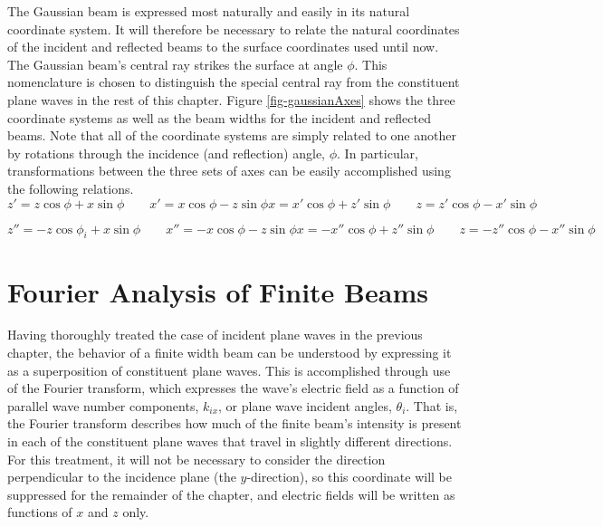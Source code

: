 \documentclass[12pt]{uthesis-v12}
\begin{document}
The Gaussian beam is expressed most naturally and easily in its natural coordinate system. It will therefore be necessary to relate the natural coordinates of the incident and reflected beams to the surface coordinates used until now. The Gaussian beam's central ray strikes the surface at angle $\phi$. This nomenclature is chosen to distinguish the special central ray from the constituent plane waves in the rest of this chapter. Figure \ref{fig-gaussianAxes} shows the three coordinate systems as well as the beam widths for the incident and reflected beams. Note that all of the coordinate systems are simply related to one another by rotations through the incidence (and reflection) angle, $\phi$. In particular, transformations between the three sets of axes can be easily accomplished using the following relations.
\begin{subequations}\label{eq-primedTransform}
\begin{equation}
z'=z\cos\phi+x\sin\phi \qquad 
x'=x\cos\phi-z\sin\phi
\end{equation}
\begin{equation}
x=x'\cos\phi+z'\sin\phi \qquad
z=z'\cos\phi-x'\sin\phi
\end{equation}
\end{subequations}

\begin{subequations}\label{eq-doublePrimedTransform}
\begin{equation}
z''=-z\cos\phi_i+x\sin\phi \qquad 
x''=-x\cos\phi-z\sin\phi
\end{equation}
\begin{equation}
x=-x''\cos\phi+z''\sin\phi \qquad
z=-z''\cos\phi-x''\sin\phi
\end{equation}
\end{subequations}

\section{Fourier Analysis of Finite Beams}
Having thoroughly treated the case of incident plane waves in the previous chapter, the behavior of a finite width beam can be understood by expressing it as a superposition of constituent plane waves. This is accomplished through use of the Fourier transform, which expresses the wave's electric field as a function of parallel wave number components, $k_{ix}$, or plane wave incident angles, $\theta_i$. That is, the Fourier transform describes how much of the finite beam's intensity is present in each of the constituent plane waves that travel in slightly different directions. For this treatment, it will not be necessary to consider the direction perpendicular to the incidence plane (the $y$-direction), so this coordinate will be suppressed for the remainder of the chapter, and electric fields will be written as functions of $x$ and $z$ only.
\end{document}
